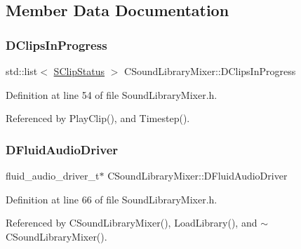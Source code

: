 \subsection{Member Data Documentation}
\hypertarget{classCSoundLibraryMixer_aad014b54093b2aeee4d7014ab329dbf9}{}\label{classCSoundLibraryMixer_aad014b54093b2aeee4d7014ab329dbf9} 
\subsubsection{\texorpdfstring{D\+Clips\+In\+Progress}{DClipsInProgress}}
{\footnotesize\ttfamily std\+::list$<$ \hyperlink{structCSoundLibraryMixer_1_1SClipStatus}{S\+Clip\+Status} $>$ C\+Sound\+Library\+Mixer\+::\+D\+Clips\+In\+Progress\hspace{0.3cm}{\ttfamily [protected]}}



Definition at line 54 of file Sound\+Library\+Mixer.\+h.



Referenced by Play\+Clip(), and Timestep().

\hypertarget{classCSoundLibraryMixer_a4ba4ccc9c6603c98a5432042e779977e}{}\label{classCSoundLibraryMixer_a4ba4ccc9c6603c98a5432042e779977e} 
\subsubsection{\texorpdfstring{D\+Fluid\+Audio\+Driver}{DFluidAudioDriver}}
{\footnotesize\ttfamily fluid\+\_\+audio\+\_\+driver\+\_\+t$\ast$ C\+Sound\+Library\+Mixer\+::\+D\+Fluid\+Audio\+Driver\hspace{0.3cm}{\ttfamily [protected]}}



Definition at line 66 of file Sound\+Library\+Mixer.\+h.



Referenced by C\+Sound\+Library\+Mixer(), Load\+Library(), and $\sim$\+C\+Sound\+Library\+Mixer().

\hypertarget{classCSoundLibraryMixer_a6773ddf83ef86bc27598f6c5cee61d9c}{}\label{classCSoundLibraryMixer_a6773ddf83ef86bc27598f6c5cee61d9c} 

